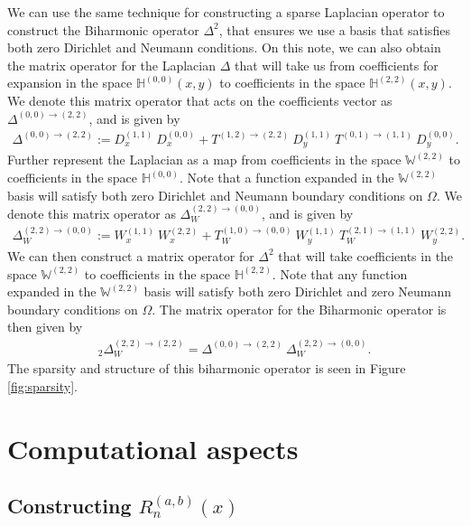 \documentclass[11pt, oneside]{article}   	%
\newcommand{\hdop}{H}
\newcommand{\bighdop}{\mathbb{\hdop}}
\newcommand{\bighdopoo}{{\mathbb{\hdop}^{(0,0)}}}
\newcommand{\genjac}{R}
\newcommand{\laplacewtt}{\Delta_W^{(2,2)\to(0,0)}}
\newcommand{\laplaceoo}{\Delta^{(0,0)\to(2,2)}}
\newcommand{\biharmonic}{_2\Delta_W^{(2,2)\to(2,2)}}
\newcommand{\bigW}{\mathbb{W}}
\begin{document}
We can use the same technique for constructing a sparse Laplacian operator to construct the Biharmonic operator $\Delta^2$, that ensures we use a basis that satisfies both zero Dirichlet and Neumann conditions. On this note, we can also obtain the matrix operator for the Laplacian $\Delta$ that will take us from coefficients for expansion in the space $\bighdopoo(x,y)$ to coefficients in the space $\bighdop^{(2,2)}(x,y)$. We denote this matrix operator that acts on the coefficients vector as $\laplaceoo$, and is given by
\begin{align*}
    \laplaceoo := D_x^{(1,1)} \: D_x^{(0,0)} + T^{(1,2)\to(2,2)} \: D_y^{(1,1)} \: T^{(0,1)\to(1,1)} \: D_y^{(0,0)}.
\end{align*}
Further represent the Laplacian as a map from coefficients in the space $\bigW^{(2,2)}$ to coefficients in the space $\bighdopoo$. Note that a function expanded in the $\bigW^{(2,2)}$ basis will satisfy both zero Dirichlet and Neumann boundary conditions on $\Omega$. We denote this matrix operator as $\laplacewtt$, and is given by
\begin{align*}
	\laplacewtt := W_x^{(1,1)} \: W_x^{(2,2)} + T_W^{(1,0)\to(0,0)} \: W_y^{(1,1)} \: T_W^{(2,1)\to(1,1)} \: W_y^{(2,2)}.
\end{align*}
We can then construct a matrix operator for $\Delta^2$ that will take coefficients in the space $\bigW^{(2,2)}$ to coefficients in the space $\bighdop^{(2,2)}$. Note that any function expanded in the $\bigW^{(2,2)}$ basis will satisfy both zero Dirichlet and zero Neumann boundary conditions on $\Omega$. The matrix operator for the Biharmonic operator is then given by
\begin{align*}
	\biharmonic = \laplaceoo \: \laplacewtt.
\end{align*}
The sparsity and structure of this biharmonic operator is seen in Figure \ref{fig:sparsity}.



\section{Computational aspects}\label{Section:Computation}

\subsection{Constructing $\genjac_n^{(a,b)}(x)$}
\end{document}
